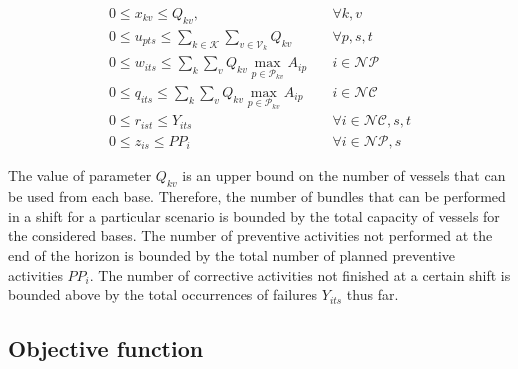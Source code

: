 \begin{align}
\label{eq:bound1ICCS}
  0 \leq x_{kv} \leq Q_{kv},				&\quad	\forall k,v\\
\label{eq:bound2ICCS}
  0 \leq u_{pts} \leq \sum\limits_{k\in\mathcal{K}} \sum\limits_{v\in\mathcal{V}_k} Q_{kv} &\quad \forall p,s,t  \\
\label{eq:bound3ICCS}
0 \leq w_{its} \leq \sum\limits_{k} \sum\limits_{v} Q_{kv}\max\limits_{p\in \mathcal{P}_{kv}}A_{ip} 	&\quad i \in \mathcal{NP} \\
\label{eq:bound4ICCS}  	
0 \leq q_{its} \leq \sum\limits_{k} \sum\limits_{v} Q_{kv}\max\limits_{p\in \mathcal{P}_{kv}}A_{ip} 	&\quad i \in \mathcal{NC} \\
\label{eq:bound5ICCS}
  0 \leq r_{i st}\leq Y_{i ts} &\quad	\forall i\in\mathcal{NC},s,t\\
\label{eq:bound6ICCS}
   0 \leq z_{i s}\leq PP_{i} &\quad	\forall i\in\mathcal{NP},s
\end{align}



The value of parameter $Q_{kv}$ is an upper bound on the number of vessels that can be used from each base. Therefore, the number of bundles that can be performed in a shift for a particular scenario is bounded by the total capacity of vessels for the considered bases. The number of preventive activities not performed at the end of the horizon is bounded by the total number of planned preventive activities $PP_i$. The number of corrective activities not finished at a certain shift is bounded above by the total occurrences of failures $Y_{its}$ thus far.


\subsection{Objective function}

